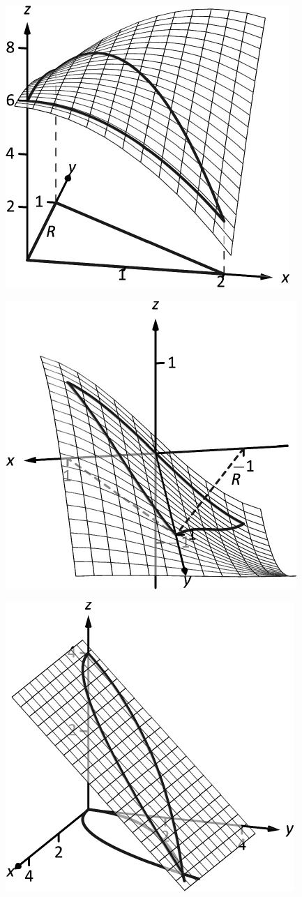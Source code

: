 \documentclass[10pt]{article}
\begin{document}
\includegraphics{figdouble2_3DBW.pdf}
\texttt{}

\includegraphics{figdouble3_3DBW.pdf}
\texttt{}

\includegraphics{figdouble4_3DBW.pdf}
\texttt{}
\end{document}
